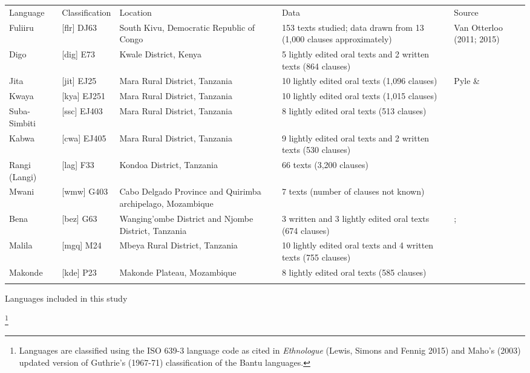 \documentclass[output=paper]{langsci/langscibook}
\begin{document}
\begin{tabularx}{\textwidth}{XXXXX}
\lsptoprule
 Language & Classification & Location & Data & Source\\
 Fuliiru & [flr] DJ63 & South Kivu, Democratic Republic of Congo & 153 texts studied; data drawn from 13 (1,000 clauses approximately) & Van Otterloo (2011; 2015)\\
 Digo & [dig] E73 & Kwale District, Kenya & 5 lightly edited oral texts and 2 written texts (864 clauses) & \citet{Nicolle2015a}\\
 Jita & [jit] EJ25 & Mara Rural District, Tanzania & 10 lightly edited oral texts (1,096 clauses) & Pyle \& \citet{Robinson2015}\\
 Kwaya & [kya] EJ251 & Mara Rural District, Tanzania & 10 lightly edited oral texts (1,015 clauses) & \citet{Odom2015}\\
 Suba-Simbiti & [ssc] EJ403 & Mara Rural District, Tanzania & 8 lightly edited oral texts (513 clauses) & \citet{Masatu2015}\\
 Kabwa & [cwa] EJ405 & Mara Rural District, Tanzania & 9 lightly edited oral texts and 2 written texts (530 clauses) & \citet{Walker2011}\\
 Rangi (Langi) & [lag] F33 & Kondoa District, Tanzania & 66 texts (3,200 clauses) & \citet{Stegen2011}\\
 Mwani & [wmw] G403 & Cabo Delgado Province and Quirimba archipelago, Mozambique & 7 texts (number of clauses not known) & \citet{Floor2005}\\
 Bena & [bez] G63 & Wanging’ombe District and Njombe District, Tanzania & 3 written and 3 lightly edited oral texts (674 clauses) & \citet{Broomhall2011}; \citet{Eaton2015a}\\
 Malila & [mgq] M24 & Mbeya Rural District, Tanzania & 10 lightly edited oral texts and 4 written texts (755 clauses) & \citet{Eaton2015b}\\
 Makonde & [kde] P23 & Makonde Plateau, Mozambique & 8 lightly edited oral texts (585 clauses) & \citet{Leach2015}\\
\lspbottomrule
\end{tabularx}
\begin{table}
\caption{Languages included in this study}
\footnote{Languages are classified using the ISO 639-3 language code as cited in \textit{Ethnologue} (Lewis, Simons and Fennig 2015) and Maho’s (2003) updated version of Guthrie’s (1967-71) classification of the Bantu languages.}
\label{tab:1}
\end{table}
\end{document}
